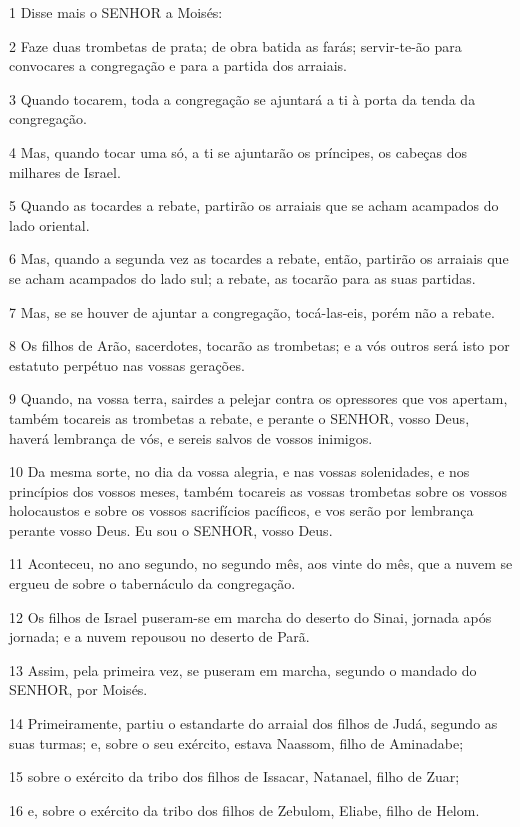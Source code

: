 \par 1 Disse mais o SENHOR a Moisés:
\par 2 Faze duas trombetas de prata; de obra batida as farás; servir-te-ão para convocares a congregação e para a partida dos arraiais.
\par 3 Quando tocarem, toda a congregação se ajuntará a ti à porta da tenda da congregação.
\par 4 Mas, quando tocar uma só, a ti se ajuntarão os príncipes, os cabeças dos milhares de Israel.
\par 5 Quando as tocardes a rebate, partirão os arraiais que se acham acampados do lado oriental.
\par 6 Mas, quando a segunda vez as tocardes a rebate, então, partirão os arraiais que se acham acampados do lado sul; a rebate, as tocarão para as suas partidas.
\par 7 Mas, se se houver de ajuntar a congregação, tocá-las-eis, porém não a rebate.
\par 8 Os filhos de Arão, sacerdotes, tocarão as trombetas; e a vós outros será isto por estatuto perpétuo nas vossas gerações.
\par 9 Quando, na vossa terra, sairdes a pelejar contra os opressores que vos apertam, também tocareis as trombetas a rebate, e perante o SENHOR, vosso Deus, haverá lembrança de vós, e sereis salvos de vossos inimigos.
\par 10 Da mesma sorte, no dia da vossa alegria, e nas vossas solenidades, e nos princípios dos vossos meses, também tocareis as vossas trombetas sobre os vossos holocaustos e sobre os vossos sacrifícios pacíficos, e vos serão por lembrança perante vosso Deus. Eu sou o SENHOR, vosso Deus.
\par 11 Aconteceu, no ano segundo, no segundo mês, aos vinte do mês, que a nuvem se ergueu de sobre o tabernáculo da congregação.
\par 12 Os filhos de Israel puseram-se em marcha do deserto do Sinai, jornada após jornada; e a nuvem repousou no deserto de Parã.
\par 13 Assim, pela primeira vez, se puseram em marcha, segundo o mandado do SENHOR, por Moisés.
\par 14 Primeiramente, partiu o estandarte do arraial dos filhos de Judá, segundo as suas turmas; e, sobre o seu exército, estava Naassom, filho de Aminadabe;
\par 15 sobre o exército da tribo dos filhos de Issacar, Natanael, filho de Zuar;
\par 16 e, sobre o exército da tribo dos filhos de Zebulom, Eliabe, filho de Helom.
